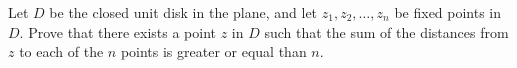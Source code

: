 Let \(D\) be the closed unit disk in the plane, and let \(z_1,z_2,\ldots,z_n\) be fixed points in \(D\). Prove that there exists a point \(z\) in \(D\) such that the sum of the distances from \(z\) to each of the \(n\) points is greater or equal than \(n\).